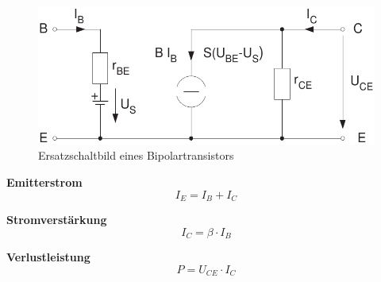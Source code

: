 \documentclass[a5paper, 12pt]{scrartcl}
\begin{document}
\begin{figure}[H]
  \centering
  \includegraphics[width=.6\textwidth]{ESBTransistor}
  \caption{Ersatzschaltbild eines Bipolartransistors}
\end{figure}

\textbf{Emitterstrom}
\[I_E = I_B + I_C\]

\textbf{Stromverstärkung}
\[I_C = \beta \cdot I_B\]

\textbf{Verlustleistung}
\[P = U_{CE} \cdot I_C\]
\end{document}
